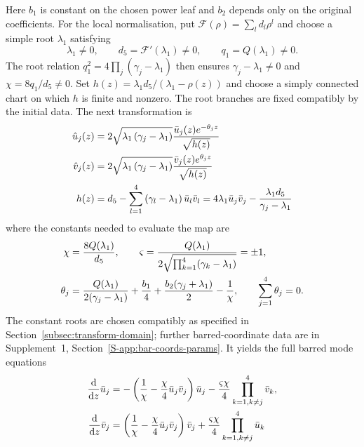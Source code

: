 \documentclass{optica-article}
\numberwithin{equation}{section}
\begin{document}
Here $b_1$ is constant on the chosen power leaf and $b_2$ depends only on the original coefficients.
For the local normalisation, put $\mathcal F(\rho)=\sum_l d_l\rho^l$ and choose a simple root $\lambda_1$ satisfying
\begin{equation}
\lambda_1\ne0,\qquad d_5=\mathcal F'(\lambda_1)\ne0,\qquad
q_1=Q(\lambda_1)\ne0.
\end{equation}
The root relation $q_1^2=4\prod_j(\gamma_j-\lambda_1)$ then ensures $\gamma_j-\lambda_1\ne0$ and $\chi=8q_1/d_5\ne0$.
Set $h(z)=\lambda_1d_5/(\lambda_1-\rho(z))$ and choose a simply connected chart on which $h$ is finite and nonzero.
The root branches are fixed compatibly by the initial data.
The next transformation is
\begin{align}
\hat{u}_j(z) &= 2 \sqrt{{\lambda}_{1} \left({\gamma}_{j} - {\lambda}_{1}\right)} \frac{\bar{u}_j(z) e^{-\theta_j z}}{\sqrt{h{\left(z \right)}}} \notag \\
\hat{v}_j(z) &= 2 \sqrt{{\lambda}_{1} \left({\gamma}_{j} - {\lambda}_{1}\right)}  \frac{\bar{v}_j(z) e^{\theta_j z} }{\sqrt{h{\left(z \right)}}} \notag \\
h{\left(z \right)} &= {d}_{5} - \sum_{l=1}^{4} \left({\gamma}_{l} - {\lambda}_{1}\right) \bar{u}_l \bar{v}_l = 4 {\lambda}_{1} \bar{u}_j \bar{v}_j - \frac{{\lambda}_{1}{d}_{5} }{{\gamma}_{j} - {\lambda}_{1}} \label{eq:hat-to-bar}
\end{align}
where the constants needed to evaluate the map are
\begin{align}
\chi&=\frac{8Q(\lambda_1)}{d_5},\qquad
\varsigma=\frac{Q(\lambda_1)}{2\sqrt{\prod_{k=1}^4(\gamma_k-\lambda_1)}}=\pm1,\notag\\
\theta_j&=\frac{Q(\lambda_1)}{2(\gamma_j-\lambda_1)}
+\frac{b_1}{4}+\frac{b_2(\gamma_j+\lambda_1)}{2}-\frac1\chi,
\qquad \sum_{j=1}^4\theta_j=0.
\label{eq:normalisation-constants}
\end{align}
The constant roots are chosen compatibly as specified in Section~\ref{subsec:transform-domain}; further barred-coordinate data are in Supplement~1, Section~\ref*{S-app:bar-coords-params}.
It yields the full barred mode equations
\begin{align}
\frac{\mathrm{d}}{\mathrm{d}z} \bar{u}_j &= -\left(\frac{1}{\chi} - \frac{\chi}{4}\bar{u}_j \bar{v}_j \right) \bar{u}_j - \frac{\varsigma \chi}{4} \prod\limits_{k=1, k \ne j}^{4} \bar{v}_k, \notag \\
\frac{\mathrm{d}}{\mathrm{d}z} \bar{v}_j &= \left( \frac{1}{\chi} - \frac{\chi}{4}\bar{u}_j \bar{v}_j\right) \bar{v}_j + \frac{\varsigma \chi}{4} \prod\limits_{k=1, k \ne j}^{4} \bar{u}_k \label{eq:uv-bar-system}
\end{align}
\end{document}

